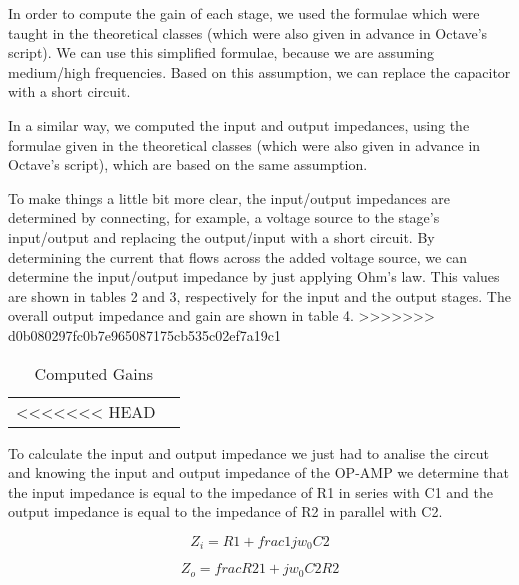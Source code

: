 \par In order to compute the gain of each stage, we used the formulae which were taught in the theoretical classes (which were also given in advance in Octave's script). We can use this simplified formulae, because we are assuming medium/high frequencies. Based on this assumption, we can replace the capacitor with a short circuit.
\par In a similar way, we computed the input and output impedances, using the formulae given in the theoretical classes (which were also given in advance in Octave's script), which are based on the same assumption.
\par To make things a little bit more clear, the input/output impedances are determined by connecting, for example, a voltage source to the stage's input/output and replacing the output/input with a short circuit. By determining the current that flows across the added voltage source, we can determine the input/output impedance by just applying Ohm's law. This values are shown in tables 2 and 3, respectively for the input and the output stages. The overall output impedance and gain are shown in table 4.
>>>>>>> d0b080297fc0b7e965087175cb535c02ef7a19c1

\vspace{5mm}
\begin{table}[H]
	\centering
	\begin{tabularx}{0.9\textwidth} {
 	    | >{\raggedright\arraybackslash}X
  	    | >{\raggedleft\arraybackslash}X | }
	\hline
<<<<<<< HEAD
	
	\end{tabularx}
	\caption{Computed Gains}
	\label{tab:currents}
\end{table}
\vspace{5mm}
 
\par To calculate the input and output impedance we just had to analise the circut and knowing the input and output impedance of the OP-AMP we determine that the input impedance is equal to the impedance of R1 in series with C1 and the output impedance is equal to the impedance of R2 in parallel with C2.

\begin{equation}
	Z_i = R1 + frac{1}{j w_0 C2}
\end{equation}

\begin{equation}
	Z_o = frac{R2}{1 + j w_0 C2 R2}
\end{equation}

